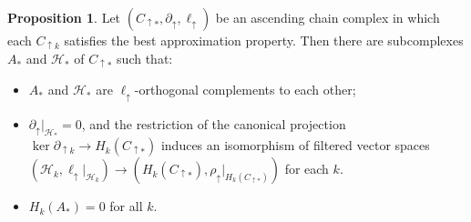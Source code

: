 \documentclass[11pt]{amsart}
\theoremstyle{definition}
\newtheorem{prop}[theorem]{Proposition}
\theoremstyle{remark}
\numberwithin{equation}{section}
\begin{document}
\begin{prop}\label{ahdecomp}
	Let $(C_{\uparrow *},\partial_{\uparrow},\ell_{\uparrow})$ be an ascending chain complex in which each $C_{\uparrow k}$ satisfies the best approximation property.  Then there are subcomplexes $A_*$ and $\mathcal{H}_*$ of $C_{\uparrow *}$ such that:
	\begin{itemize}
		\item $A_*$ and $\mathcal{H}_*$ are $\ell_{\uparrow}$-orthogonal complements to each other;
		\item $\partial_{\uparrow}|_{\mathcal{H}_*}=0$, and the restriction of the canonical projection $\ker\partial_{\uparrow k}\to H_k(C_{\uparrow *})$ induces an isomorphism of filtered vector spaces $(\mathcal{H}_k,\ell_{\uparrow}|_{\mathcal{H}_k})\to (H_k(C_{\uparrow *}),\rho_{\uparrow}|_{H_k(C_{\uparrow *})})$ for each $k$.
		\item  $H_k(A_*)=0$ for all $k$.
	\end{itemize}
\end{prop}
\end{document}
